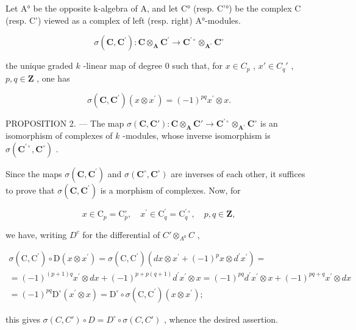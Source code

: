 Let A° be the opposite k-algebra of A, and let C° (resp. C'°) be the complex C (resp. C') viewed as a complex of left (resp. right) A°-modules.

\[
\sigma (\mathbf {C}, \mathbf {C} ^ {\prime}): \mathbf {C} \otimes_ {\mathbf {A}} \mathbf {C} ^ {\prime} \rightarrow \mathbf {C} ^ {\prime \circ} \otimes_ {\mathbf {A} ^ {\circ}} \mathbf {C} ^ {\circ}
\]

the unique graded \(k\) -linear map of degree 0 such that, for \(x \in C_p\) , \(x' \in C_q'\) , \(p, q \in \mathbf{Z}\) , one has

\[
\sigma (\mathbf {C}, \mathbf {C} ^ {\prime}) (x \otimes x ^ {\prime}) = (- 1) ^ {p q} x ^ {\prime} \otimes x.
\]

PROPOSITION 2. — The map \(\sigma(\mathbf{C},\mathbf{C}'):\mathbf{C}\otimes_{\mathbf{A}}\mathbf{C}'\to\mathbf{C}^{\prime\circ}\otimes_{\mathbf{A}^{\circ}}\mathbf{C}^{\circ}\) is an isomorphism of complexes of \(k\) -modules, whose inverse isomorphism is \(\sigma(\mathbf{C}^{\prime\circ},\mathbf{C}^{\circ})\) .

Since the maps \(\sigma(\mathbf{C},\mathbf{C}^{\prime})\) and \(\sigma(\mathbf{C}^{\circ},\mathbf{C}^{\circ})\) are inverses of each other, it suffices to prove that \(\sigma(\mathbf{C},\mathbf{C}^{\prime})\) is a morphism of complexes. Now, for

\[
x \in \mathrm{C} _ {p} = \mathrm{C} _ {p} ^ {\circ}, \quad x ^ {\prime} \in \mathrm{C} _ {q} ^ {\prime} = \mathrm{C} _ {q} ^ {\prime \circ}, \quad p, q \in \mathbf {Z},
\]

we have, writing \(D^{c}\) for the differential of \(C' \otimes_{A^{0}} C\) ,

\[
\begin{array}{l} \sigma (\mathrm{C}, \mathrm{C} ^ {\prime}) \circ \mathrm{D} (x \otimes x ^ {\prime}) = \sigma (\mathrm{C}, \mathrm{C} ^ {\prime}) (d x \otimes x ^ {\prime} + (- 1) ^ {p} x \otimes d ^ {\prime} x ^ {\prime}) = \\ = (- 1) ^ {(p + 1) q} x ^ {\prime} \otimes d x + (- 1) ^ {p + p (q + 1)} d ^ {\prime} x ^ {\prime} \otimes x = (- 1) ^ {p q} d ^ {\prime} x ^ {\prime} \otimes x + (- 1) ^ {p q + q} x ^ {\prime} \otimes d x \\ = (- 1) ^ {p q} \mathrm{D} ^ {\circ} (x ^ {\prime} \otimes x) = \mathrm{D} ^ {\circ} \circ \sigma (\mathrm{C}, \mathrm{C} ^ {\prime}) (x \otimes x ^ {\prime}); \end{array}
\]

this gives \(\sigma(C, C') \circ D = D^{\circ} \circ \sigma(C, C')\) , whence the desired assertion.

